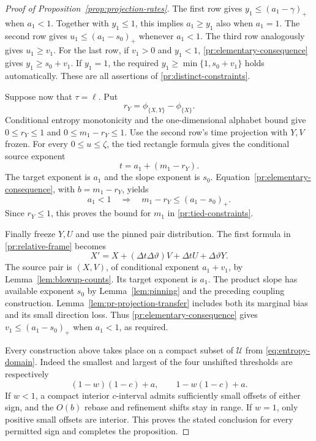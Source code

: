 \begin{proof}[Proof of Proposition~\ref{prop:projection-rates}]
The first row gives $y_1\le(a_1-\gamma)_+$ when $a_1<1$.
Together with $y_1\le1$, this implies $a_1\ge y_1$ also when
$a_1=1$. The second row gives
$u_1\le(a_1-s_0)_+$ whenever $a_1<1$.
The third row analogously gives $u_1\ge v_1$.
For the last row, if $v_1>0$ and $y_1<1$,
\eqref{pr:elementary-consequence} gives $y_1\ge s_0+v_1$.
If $y_1=1$, the required
$y_1\ge\min\{1,s_0+v_1\}$ holds automatically.
These are all assertions of \eqref{pr:distinct-constraints}.

Suppose now that $\tau=\ell$. Put
\[
 r_Y=\phi_{\{X,Y\}}-\phi_{\{X\}}.
\]
Conditional entropy monotonicity and the one-dimensional
alphabet bound give
$0\le r_Y\le1$ and $0\le m_1-r_Y\le1$.
Use the second row's time projection with $Y,V$ frozen.
For every $0\le u\le\zeta$, the tied rectangle formula gives
the conditional source exponent
\[
 t=a_1+(m_1-r_Y).
\]
The target exponent is $a_1$ and the slope exponent is $s_0$.
Equation~\eqref{pr:elementary-consequence}, with
$b=m_1-r_Y$, yields
\[
 a_1<1\quad\Longrightarrow\quad
 m_1-r_Y\le(a_1-s_0)_+.
\]
Since $r_Y\le1$, this proves the bound for $m_1$ in
\eqref{pr:tied-constraints}.

Finally freeze $Y,U$ and use the pinned pair distribution.
The first formula in \eqref{pr:relative-frame} becomes
\[
 X'=X+(\Delta t\Delta\vartheta)V
                 +\Delta t U+\Delta\vartheta Y.
\]
The source pair is $(X,V)$, of conditional exponent
$a_1+v_1$, by Lemma~\ref{lem:blowup-counts}.
Its target exponent is $a_1$.
The product slope has available exponent $s_0$ by
Lemma~\ref{lem:pinning} and the preceding coupling construction.
Lemma~\ref{lem:pr-projection-transfer} includes both its marginal
bias and its small direction loss. Thus
\eqref{pr:elementary-consequence} gives
$v_1\le(a_1-s_0)_+$ when $a_1<1$, as required.

Every construction above takes place on a compact subset of
$\mathcal U$ from \eqref{eq:entropy-domain}.
Indeed the smallest and largest of the four unshifted thresholds
are respectively
\[
 (1-w)(1-c)+a,\qquad 1-w(1-c)+a.
\]
If $w<1$, a compact interior $c$-interval admits sufficiently
small offsets of either sign, and the $O(b)$ rebase and
refinement shifts stay in range. If $w=1$, only positive small
offsets are interior. This proves the stated conclusion for every
permitted sign and completes the proposition.
\end{proof}
